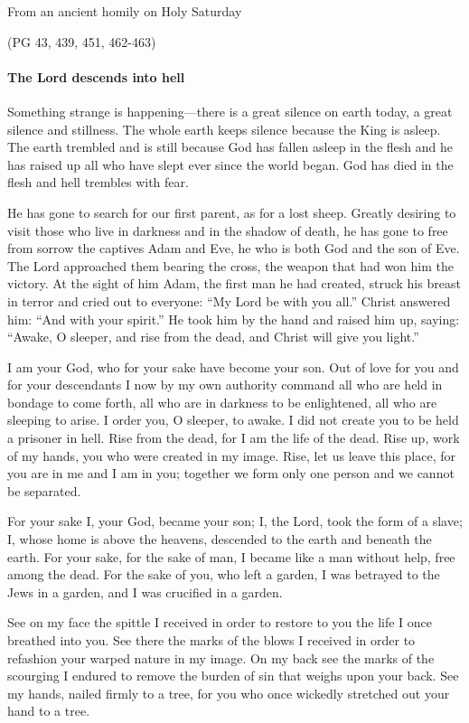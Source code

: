 From an ancient homily on Holy Saturday

\par \hfill(PG 43, 439, 451, 462-463)

\paragraph{The Lord descends into hell
}

Something strange is happening—there is a great silence on earth today, a great silence and stillness. The whole earth keeps silence because the King is asleep. The earth trembled and is still because God has fallen asleep in the flesh and he has raised up all who have slept ever since the world began. God has died in the flesh and hell trembles with fear.

He has gone to search for our first parent, as for a lost sheep. Greatly desiring to visit those who live in darkness and in the shadow of death, he has gone to free from sorrow the captives Adam and Eve, he who is both God and the son of Eve. The Lord approached them bearing the cross, the weapon that had won him the victory. At the sight of him Adam, the first man he had created, struck his breast in terror and cried out to everyone: “My Lord be with you all.” Christ answered him: “And with your spirit.” He took him by the hand and raised him up, saying: “Awake, O sleeper, and rise from the dead, and Christ will give you light.”

I am your God, who for your sake have become your son. Out of love for you and for your descendants I now by my own authority command all who are held in bondage to come forth, all who are in darkness to be enlightened, all who are sleeping to arise. I order you, O sleeper, to awake. I did not create you to be held a prisoner in hell. Rise from the dead, for I am the life of the dead. Rise up, work of my hands, you who were created in my image. Rise, let us leave this place, for you are in me and I am in you; together we form only one person and we cannot be separated.

For your sake I, your God, became your son; I, the Lord, took the form of a slave; I, whose home is above the heavens, descended to the earth and beneath the earth. For your sake, for the sake of man, I became like a man without help, free among the dead. For the sake of you, who left a garden, I was betrayed to the Jews in a garden, and I was crucified in a garden.

See on my face the spittle I received in order to restore to you the life I once breathed into you. See there the marks of the blows I received in order to refashion your warped nature in my image. On my back see the marks of the scourging I endured to remove the burden of sin that weighs upon your back. See my hands, nailed firmly to a tree, for you who once wickedly stretched out your hand to a tree.

